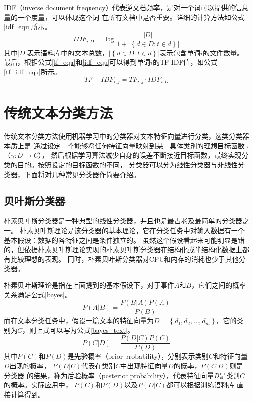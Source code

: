 IDF（inverse document frequency）代表逆文档频率，是对一个词可以提供的信息量的一个度量，可以体现这个词
在所有文档中是否重要。详细的计算方法如公式\ref{idf_equ}所示。
\begin{equation}
    IDF_{i,D}=\log \frac{\left | D \right |}{1+\left | \left \{ d\in D:t\in d \right \} \right |}
    \label{idf_equ}
\end{equation}
其中$\left | D \right |$表示语料库中的文本总数，$\left | \left \{ d\in D:t\in d \right \} \right |$表示包含单词$i$的文件数量。
最后，根据公式\ref{tf_equ}和\ref{idf_equ}可以得到单词$i$的TF-IDF值，如公式\ref{tf_idf_equ}所示。
\begin{equation}
    TF-IDF_{i,j}=TF_{i,j} \cdot IDF_{i,D}
    \label{tf_idf_equ}
\end{equation}

\section{传统文本分类方法}
传统文本分类方法使用机器学习中的分类器对文本特征向量进行分类，这类分类器本质上是
通过设定一个能够将任何特征向量映射到某一具体类别的理想目标函数$\gamma$（$\gamma :D\rightarrow C$），
然后根据学习算法减少自身的误差不断接近目标函数，最终实现分类的目的。按照设定的目标函数的不同，
分类器可以分为线性分类器与非线性分类器，下面将对几种常见分类器作简要介绍。
\subsection{贝叶斯分类器}
朴素贝叶斯分类器是一种典型的线性分类器，并且也是最古老及最简单的分类器之一。
朴素贝叶斯理论是该分类器的基本理论，它在分类任务中对输入数据有一个基本假设：数据的各特征之间是条件独立的。
虽然这个假设看起来可能明显是错的，但依据朴素贝叶斯理论实现的朴素贝叶斯分类器在结构化或半结构化数据上都有比较理想的表现。
同时，朴素贝叶斯分类器对CPU和内存的消耗也少于其他分类器。

朴素贝叶斯理论是指在上面提到的基本假设下，对于事件$A$和$B$，它们之间的概率关系满足公式\ref{bayes}。
\begin{equation}
    P\left ( A | B\right )=\frac{P\left ( B | A\right )P\left ( A \right )}{P\left ( B \right )}
    \label{bayes}
\end{equation}
而在文本分类任务中，假设一篇文本的特征向量为$D=\left \{ d_1,d_2,...,d_m \right \}$，它的类别为$C$，则上式可以写为公式\ref{bayes_text}。
\begin{equation}
    P\left ( C | D\right )=\frac{P\left ( D | C\right )P\left ( C \right )}{P\left ( D \right )}
    \label{bayes_text}
\end{equation}
其中$P\left ( C \right )$和$P\left ( D \right )$是先验概率（prior probability），分别表示类别$C$和特征向量$D$出现的概率，
$P\left ( D | C\right )$代表在类别$C$中出现特征向量$D$的概率，$P\left ( C | D\right )$则是分类器
的结果，称为后验概率（posterior probability），代表特征向量$D$是类别$C$的概率。实际应用中，
$P\left ( C \right )$和$P\left ( D \right )$以及$P\left ( D | C\right )$都可以根据训练语料库
直接计算得到。

